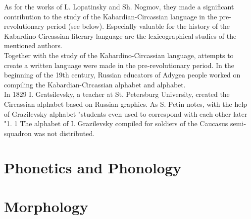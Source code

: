 \documentclass[a4paper,12pt]{book}
\newcommand{\1}[1]{\textbf{\emph{#1}}} %
\newcommand{\2}[1]{\textbf{[#1]}} %
\newcommand{\3}[1]{\fontsize{11pt}{0cm}\textbf{\emph{#1}}} %
\newcommand{\4}[1]{\fontsize{10pt}{0cm}\emph{#1}}	%
\newcommand{\5}[1]{\textbf{/#1/}} %
\newcommand{\6}[1]{\textbf{[#1]}} %
\newcommand{\7}[1]{\fontsize{12pt}{0cm}\emph{#1}} %
\newcommand{\8}[1]{\fontsize{12pt}{0cm}`#1'} %
\newcommand{\9}[1]{\fontsize{12pt}{0cm}(lit. `#1')} %
\begin{document}
As for the works of L. Lopatinsky and Sh. Nogmov, they made a significant contribution to the study of the Kabardian-Circassian language in the pre-revolutionary period (see below). Especially valuable for the history of the Kabardino-Circassian literary language are the lexicographical studies of the mentioned authors.\\
Together with the study of the Kabardino-Circassian language, attempts to create a written language were made in the pre-revolutionary period. In the beginning of the 19th century, Russian educators of Adygea people worked on compiling the Kabardian-Circassian alphabet and alphabet.\\
In 1829 I. Gratsilevsky, a teacher at St. Petersburg University, created the Circassian alphabet based on Russian graphics. As S. Petin notes, with the help of Grazilevsky alphabet "students even used to correspond with each other later "1. 1 The alphabet of I. Grazilevsky compiled for soldiers of the Caucasus semi-squadron was not distributed.\\

\chapter{Phonetics and Phonology}
\chapter{Morphology}
\end{document}
